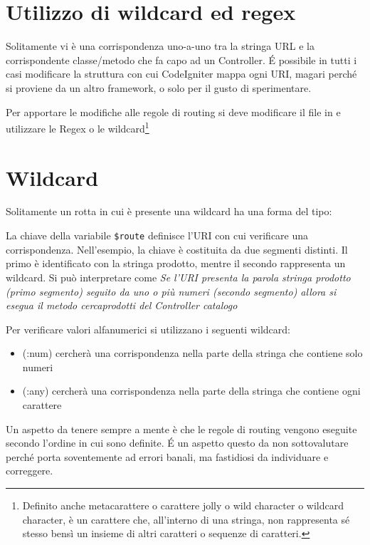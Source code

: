 \section{Utilizzo di wildcard ed regex}
Solitamente vi è una corrispondenza uno-a-uno tra la stringa \ac{URL} e la corrispondente classe/metodo che fa capo ad un Controller. \'E possibile in tutti i casi modificare la struttura con cui CodeIgniter mappa ogni \ac{URI}, magari perché si proviene da un altro framework, o solo per il gusto di sperimentare. 

Per apportare le modifiche alle regole di routing si deve modificare il file  in  e utilizzare le Regex o le wildcard\footnote{Definito anche metacarattere o carattere jolly o wild character o wildcard character, è un carattere che, all'interno di una stringa, non rappresenta sé stesso bensì un insieme di altri caratteri o sequenze di caratteri.}

\section{Wildcard}
Solitamente un rotta in cui è presente una wildcard ha una forma del tipo:


La chiave della variabile \verb|$route| definisce l'\ac{URI} con cui verificare una corrispondenza. Nell'esempio, la chiave è costituita da due segmenti distinti. Il primo è identificato con la stringa prodotto, mentre il secondo rappresenta un wildcard. Si può interpretare come \emph{Se l'URI presenta la parola stringa prodotto (primo segmento) seguito da uno o più numeri (secondo segmento) allora si esegua il metodo cercaprodotti del Controller catalogo}

Per verificare valori alfanumerici si utilizzano i seguenti wildcard:

\begin{itemize}
\item (:num) cercherà una corrispondenza nella parte della stringa che contiene solo numeri

\item (:any) cercherà una corrispondenza nella parte della stringa che contiene ogni carattere
\end{itemize}

Un aspetto da tenere sempre a mente è che le regole di routing vengono eseguite secondo l'ordine in cui sono definite. \'E un aspetto questo da non sottovalutare perché porta soventemente ad errori banali, ma fastidiosi da individuare e correggere. 

